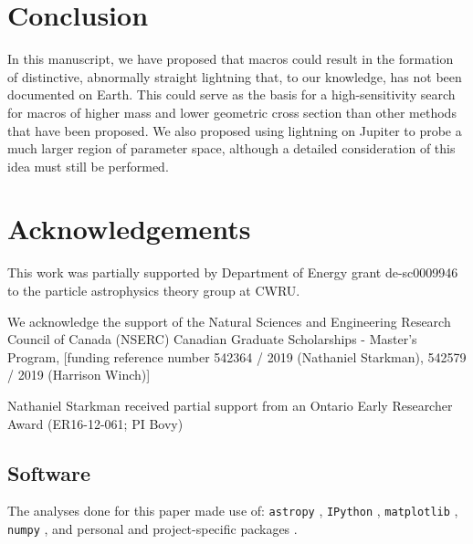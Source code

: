 \documentclass[%
 reprint,
 amsmath,amssymb,
 aps,
]{revtex4-2}
\begin{document}


\medskip
\section{Conclusion} %
\label{sec:conclusion}

    In this manuscript, we have proposed that macros could result in the formation of distinctive, abnormally straight lightning that, to our knowledge, has not been documented on Earth. This could serve as the basis for a high-sensitivity search for macros of higher mass and lower geometric cross section than other methods that have been proposed. We also proposed using lightning on Jupiter to probe a much larger region of parameter space, although a detailed consideration of this idea must still be performed.



\section{Acknowledgements} %
\label{sec:acknowledgements}

    This work was partially supported by Department of Energy grant de-sc0009946 to the particle astrophysics theory group at CWRU.

    We acknowledge the support of the Natural Sciences and Engineering Research Council of Canada (NSERC) Canadian Graduate Scholarships - Master's Program, [funding reference number 542364 / 2019 (Nathaniel Starkman), 542579 / 2019 (Harrison Winch)]
    
    Nathaniel Starkman received partial support from an Ontario Early Researcher Award (ER16-12-061; PI Bovy)

    \subsection*{Software} %
    \label{sub:software_citation}

         The analyses done for this paper made use of: \texttt{astropy} \cite{code_Astropy2013, code_Astropy2018}, \texttt{IPython} \cite{code_Perez2007}, \texttt{matplotlib} \cite{code_Hunter2007}, \texttt{numpy} \cite{code_Walt2011}, and personal and project-specific packages \cite{code_utilipy2020, code_starkplot2020, code_macrolightning2020}.
\end{document}
